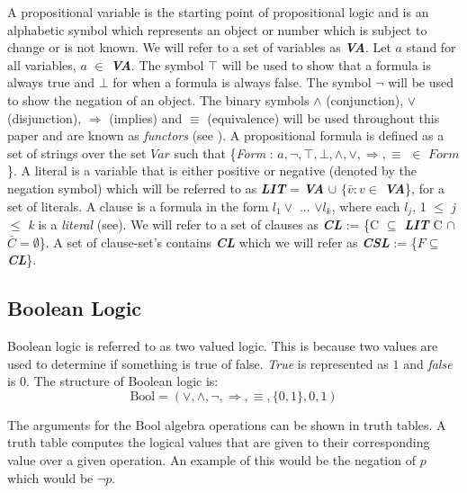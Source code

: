 \documentclass[11pt,a4paper, notitlepage]{report}
\begin{document}
A propositional variable is the starting point of propositional logic and is an alphabetic symbol which represents an object or number which is subject to change or is not known. We will refer to a set of variables as \textit{\textbf{VA}}. Let $a$ stand for all variables, $a$ $\in$ \textit{\textbf{VA}}. The symbol $\top$ will be used to show that a formula is always true and $\bot$ for when a formula is always false. The symbol $\neg$ will be used to show the negation of an object. The binary symbols $\land$ (conjunction), $\lor$ (disjunction), $\Rightarrow$ (implies) and $\equiv$ (equivalence) will be used throughout this paper and are known as \textit{functors} (see \cite{Marek2009Introduction}). A propositional formula is defined as a set of strings over the set $Var$ such that \{\textit{Form} : $a, \neg, \top, \bot, \land, \lor, \Rightarrow, \equiv$ $\in$ $Form$\}. A literal is a variable that is either positive or negative (denoted by the negation symbol) which will be referred to as \textbf{\textit{LIT}} =  \textit{\textbf{VA}} $\cup$  $\{ \bar{v} : v \in$ \textbf{\textit{VA}}\}, for a set of literals. A clause is a formula in the form $l_1 \lor$ ... $\lor l_k$, where each $l_j$, 1 $\le$ \textit{j} $\le$ \textit{k} is a \textit{literal} (see\cite{Marek2009Introduction}). We will refer to a set of clauses as \textbf{\textit{CL}} := \{C $\subseteq$ \textbf{\textit{LIT}} C $\cap$ $\bar{C} = \emptyset$\}. A set of clause-set's contains \textbf{\textit{CL}} which we will refer as \textbf{\textit{CSL}} := \{$F \subseteq$ \textit{\textbf{CL}}\}.

\subsection{Boolean Logic}
\label{sec:bool}

Boolean logic is referred to as two valued logic. This is because two values are used to determine if something is true of false. \emph{True} is represented as $1$ and \emph{false} is $0$. The structure of Boolean logic is:
\begin{displaymath}
\text{Bool} = ( \lor, \land, \neg, \Rightarrow, \equiv,\{0,1\}, 0, 1)
\end{displaymath}

The arguments for the Bool algebra operations can be shown in truth tables. A truth table computes the logical values that are given to their corresponding value over a given operation. An example of this would be the negation of $p$ which would be $\neg p$.
\end{document}

